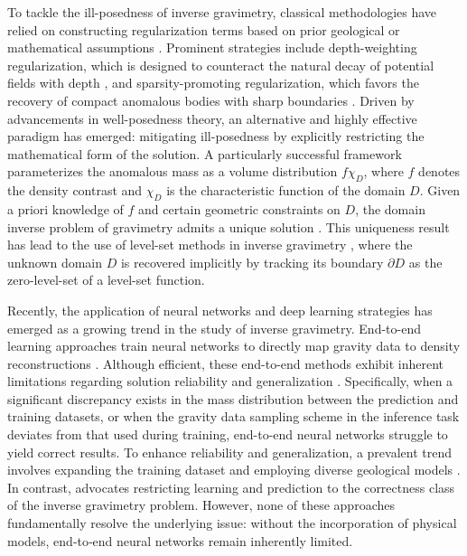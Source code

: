 \documentclass[final,hidelinks,onefignum,onetabnum]{siamart251216}
\begin{document}
To tackle the ill-posedness of inverse gravimetry, classical methodologies have relied on constructing regularization terms based on prior geological or mathematical assumptions \cite{hansen92}. Prominent strategies include depth-weighting regularization, which is designed to counteract the natural decay of potential fields with depth \cite{liold98}, and sparsity-promoting regularization, which favors the recovery of compact anomalous bodies with sharp boundaries \cite{far08}. Driven by advancements in well-posedness theory, an alternative and highly effective paradigm has emerged: mitigating ill-posedness by explicitly restricting the mathematical form of the solution. A particularly successful framework parameterizes the anomalous mass as a volume distribution $ f\chi_D$, where $f$ denotes the density contrast and $\chi_D$ is the characteristic function of the domain $D$. Given a priori knowledge of $f$ and certain geometric constraints on $D$, the domain inverse problem of gravimetry admits a unique solution \cite{isa90}. This uniqueness result has lead to the use of level-set methods in inverse gravimetry \cite{isaleuqia11,isaleuqia13,liqia21,liqia22,liden26software}, where the unknown domain $D$ is recovered implicitly by tracking its boundary $\partial D$ as the zero-level-set of a level-set function.

Recently, the application of neural networks and deep learning strategies has emerged as a growing trend in the study of inverse gravimetry. End-to-end learning approaches train neural networks to directly map gravity data to density reconstructions \cite{hualiuqizha21,zhazhaliufan22,yanhuliujiewanche22,zhochelvwan23,cheli24}. Although efficient, these end-to-end methods exhibit inherent limitations regarding solution reliability and generalization \cite{cheli24}. Specifically, when a significant discrepancy exists in the mass distribution between the prediction and training datasets, or when the gravity data sampling scheme in the inference task deviates from that used during training, end-to-end neural networks struggle to yield correct results. To enhance reliability and generalization, a prevalent trend involves expanding the training dataset and employing diverse geological models \cite{hualiuqizha21,zhazhaliufan22,zhochelvwan23}. In contrast, \cite{cheli24} advocates restricting learning and prediction to the correctness class of the inverse gravimetry problem. However, none of these approaches fundamentally resolve the underlying issue: without the incorporation of physical models, end‑to‑end neural networks remain inherently limited.
\end{document}
